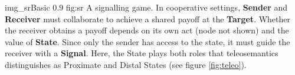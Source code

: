 \begin{myfig}
    {img_srBasic} %
    {0.9} %
    {fig:sr} %
    {A signalling game.
    In cooperative settings, \textbf{Sender} and \textbf{Receiver} must collaborate to achieve a shared payoff at the \textbf{Target}.
    Whether the receiver obtains a payoff depends on its own act (node not shown) and the value of \textbf{State}.
    Since only the sender has access to the state, it must guide the receiver with a \textbf{Signal}.
    Here, the State plays both roles that teleosemantics distinguishes as Proximate and Distal States (see figure \ref{fig:teleo}).
    } %
\end{myfig}